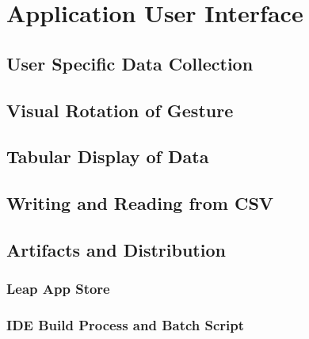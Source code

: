 \chapter{Application User Interface }

\label{Chapter6_appUI} 

\begin{comment}
-------------------------------------------------
6. Application User Interface 
	a. User Specific Data Collection
	b. Visual Rotation of Gesture
	c. Tabular Display of Data
	d. Writing and Reading from CSV
	e. Artifacts and Distribution
		i. Leap App Store
		ii. IDE Build Process and Batch Script
-------------------------------------------------
\end{comment}

\section{User Specific Data Collection}

\section{Visual Rotation of Gesture}

\section{Tabular Display of Data}

\section{Writing and Reading from CSV}


\section{Artifacts and Distribution}

\subsection{Leap App Store}

\subsection{IDE Build Process and Batch Script}


